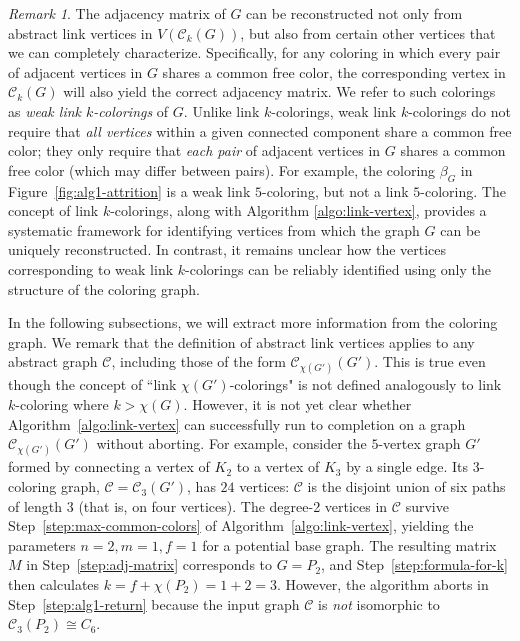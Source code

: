 \documentclass{amsart}
\theoremstyle{hypothesisstyle}
\theoremstyle{definition}
\theoremstyle{remark}
\newtheorem{remark}[theorem]{Remark}
\numberwithin{equation}{section}
\newcommand{\C}{\mathcal C}
\begin{document}
\begin{remark} The adjacency matrix of $G$ can be reconstructed not only from abstract link vertices in $V(\C_k(G))$, but also from certain other vertices that we can completely characterize. Specifically, for any coloring in which every pair of adjacent vertices in $G$ shares a common free color, the corresponding vertex in $\C_k(G)$ will also yield the correct adjacency matrix. We refer to such colorings as {\em weak link $k$-colorings} of $G$. Unlike link $k$-colorings, weak link $k$-colorings do not require that \emph{all vertices} within a given connected component share a common free color; they only require that \emph{each pair} of adjacent vertices in $G$ shares a common free color (which may differ between pairs). For example, the coloring $\beta_{G}$ in Figure~\ref{fig:alg1-attrition} is a weak link $5$-coloring, but not a link $5$-coloring. The concept of link $k$-colorings, along with Algorithm \ref{algo:link-vertex}, provides a systematic framework for identifying vertices from which the graph $G$ can be uniquely reconstructed. In contrast, it remains unclear how the vertices corresponding to weak link $k$-colorings can be reliably identified using only the structure of the coloring graph.
\end{remark}


In the following subsections, we will extract more information from the coloring graph. We remark that the definition of abstract link vertices applies to any abstract graph $\C$, including those of the form $\C_{\chi(G')}(G')$. This is true even though the concept of ``link $\chi(G')$-colorings" is not defined analogously to link $k$-coloring where $k>\chi(G)$. However, it is not yet clear whether Algorithm~\ref{algo:link-vertex} can successfully run to completion on a graph $\C_{\chi(G')}(G')$ without aborting. For example, consider the $5$-vertex graph $G'$ formed by connecting a vertex of $K_2$ to a vertex of $K_3$ by a single edge. Its 3-coloring graph, $\C=\mathcal{C}_3(G')$, has $24$ vertices: $\mathcal{C}$ is the disjoint union of six paths of length $3$ (that is, on four vertices). The degree-2 vertices in $\C$ survive Step~\ref{step:max-common-colors} of Algorithm~\ref{algo:link-vertex}, yielding the parameters $n=2,m=1,f=1$ for a potential base graph. The resulting matrix $M$ in Step~\ref{step:adj-matrix} corresponds to $G=P_2$, and Step~\ref{step:formula-for-k} then calculates $k=f+\chi(P_2)=1+2=3$. However, the algorithm aborts in Step~\ref{step:alg1-return} because the input graph $\mathcal{C}$ is \emph{not} isomorphic to $\mathcal{C}_3(P_2)\cong C_6$.  
\end{document}
